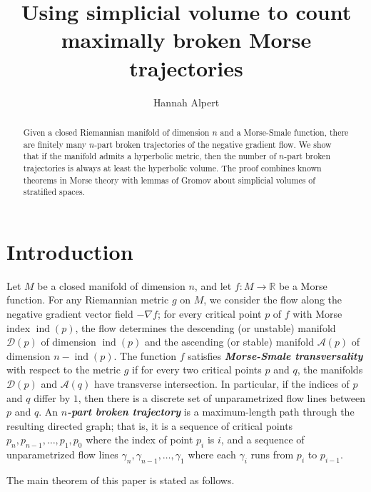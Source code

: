 \documentclass[psamsfonts]{amsart}
\theoremstyle{remark}
\DeclareMathOperator{\ind}{ind}
\begin{document}
\title[Simplicial volume and Morse broken trajectories]{Using simplicial volume to count maximally broken Morse trajectories}
\author{Hannah Alpert}
\address{MIT\\ Cambridge, MA 02139 USA}
\begin{abstract}
Given a closed Riemannian manifold of dimension $n$ and a Morse-Smale function, there are finitely many $n$-part broken trajectories of the negative gradient flow.  We show that if the manifold admits a hyperbolic metric, then the number of $n$-part broken trajectories is always at least the hyperbolic volume.  The proof combines known theorems in Morse theory with lemmas of Gromov about simplicial volumes of stratified spaces.
\end{abstract}
\maketitle

\section{Introduction}

Let $M$ be a closed manifold of dimension $n$, and let $f : M \rightarrow \mathbb{R}$ be a Morse function.  For any Riemannian metric $g$ on $M$, we consider the flow along the negative gradient vector field $-\nabla f$; for every critical point $p$ of $f$ with Morse index $\ind(p)$, the flow determines the descending (or unstable) manifold $\mathcal{D}(p)$ of dimension $\ind(p)$ and the ascending (or stable) manifold $\mathcal{A}(p)$ of dimension $n - \ind(p)$.  The function $f$ satisfies \textbf{\emph{Morse-Smale transversality}} with respect to the metric $g$ if for every two critical points $p$ and $q$, the manifolds $\mathcal{D}(p)$ and $\mathcal{A}(q)$ have transverse intersection.  In particular, if the indices of $p$ and $q$ differ by $1$, then there is a discrete set of unparametrized flow lines between $p$ and $q$.  An \textbf{\emph{$n$-part broken trajectory}} is a maximum-length path through the resulting directed graph; that is, it is a sequence of critical points $p_n, p_{n-1}, \ldots, p_1, p_0$ where the index of point $p_i$ is $i$, and a sequence of unparametrized flow lines $\gamma_n, \gamma_{n-1}, \ldots, \gamma_1$ where each $\gamma_i$ runs from $p_i$ to $p_{i-1}$.

The main theorem of this paper is stated as follows.
\end{document}
